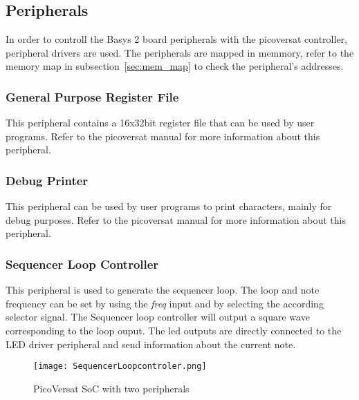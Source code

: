 \subsection{Peripherals}
\label{sec:periphs}

In order to controll the Basys 2 board peripherals with the picoversat controller, peripheral drivers are used. The peripherals are mapped in memmory, refer to the memory map in subsection~\ref{sec:mem_map} to check the peripheral's addresses.

\subsubsection{General Purpose Register File}

This peripheral contains a 16x32bit register file that can be used by user
programs. Refer to the picoversat manual for more information about this peripheral. 

\subsubsection{Debug Printer}

This peripheral can be used by user programs to print characters, mainly for
debug purposes. Refer to the picoversat manual for more information about this peripheral.

\subsubsection{Sequencer Loop Controller}

This peripheral is used to generate the sequencer loop. The loop and note frequency can be set by using the \textit{freq} input and by selecting the according selector signal.
The Sequencer loop controller will output a square wave corresponding to the loop ouput. The led outputs are directly connected to the LED driver peripheral and send information about the current note. 

\begin{figure}[!htbp]
    \centerline{\texttt{[image: SequencerLoopcontroler.png]}}
    \vspace{0cm}\caption{PicoVersat SoC with two peripherals}
    \label{fig:periphs}
\end{figure}

